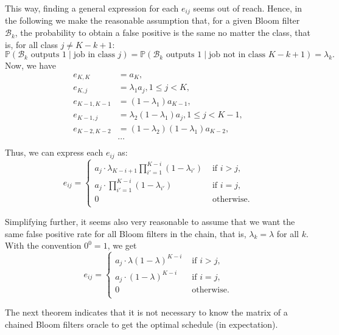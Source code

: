 \documentclass{article}
\begin{document}
This way, finding a general expression for each \(e_{ij}\) seems out of reach.
Hence, in the following we make the reasonable assumption that, for a given Bloom filter \(\mathcal{B}_k\), the probability to obtain a false positive is the same no matter the class, that is, for all class \(j\ne K-k+1\):
\[
    \mathbb{P}(\mathcal{B}_k\text{ outputs 1}\mid\text{job in class }j)=
    \mathbb{P}(\mathcal{B}_k\text{ outputs 1}\mid\text{job not in class }K-k+1)=
    \lambda_k.
\]
Now, we have
\begin{align*}
    e_{K,K}&=a_K, \\
    e_{K,j}&=\lambda_1a_j,1\le j<K, \\
    e_{K-1,K-1}&=(1-\lambda_1)a_{K-1}, \\
    e_{K-1,j}&=\lambda_2(1-\lambda_1)a_j,1\le j<K-1, \\
    e_{K-2,K-2}&=(1-\lambda_2)(1-\lambda_1)a_{K-2}, \\
    &\cdots \\
\end{align*}
Thus, we can express each \(e_{ij}\) as:
\[
    e_{ij}=\begin{cases}
        a_j\cdot\lambda_{K-i+1}\prod_{i'=1}^{K-i} (1-\lambda_{i'}) & \text{ if }i>j, \\
        a_j\cdot\prod_{i'=1}^{K-i} (1-\lambda_{i'}) & \text{ if }i=j, \\
        0 & \text{ otherwise.} \\
    \end{cases}
\]

Simplifying further, it seems also very reasonable to assume that we want the same false positive rate for all Bloom filters in the chain, that is, \(\lambda_k=\lambda\) for all \(k\).
With the convention \(0^0=1\), we get
\[
    e_{ij}=\begin{cases}
        a_j\cdot\lambda(1-\lambda)^{K-i} & \text{ if }i>j, \\
        a_j\cdot(1-\lambda)^{K-i} & \text{ if }i=j, \\
        0 & \text{ otherwise.} \\
    \end{cases}
\]

The next theorem indicates that it is not necessary to know the matrix of a chained Bloom filters oracle to get the optimal schedule (in expectation).
\end{document}
